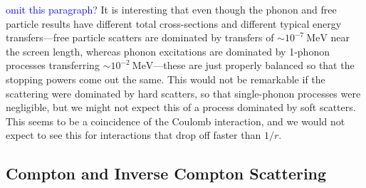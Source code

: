 \documentclass[twocolumn,preprintnumbers,amsmath,amssymb,prl, superscriptaddress]{revtex4}
\def\r{\right)}
\def\l{\left(}
\begin{document}
\begin{appendices}
\textcolor{blue}{omit this paragraph?} It is interesting that even though the phonon and free particle results have different total cross-sections and different typical energy transfers---free particle scatters are dominated by transfers of $ \sim 10^{-7}~\text{MeV}$ near the screen length, whereas phonon excitations are dominated by 1-phonon processes transferring $ \sim 10^{-2}~\text{MeV}$---these are just properly balanced so that the stopping powers come out the same. This would not be remarkable if the scattering were dominated by hard scatters, so that single-phonon processes were negligible, but we might not expect this of a process dominated by soft scatters. This seems to be a coincidence of the Coulomb interaction, and we would not expect to see this for interactions that drop off faster than $1 / r$.


 \subsection{Compton and Inverse Compton Scattering}


\end{appendices}
\end{document}
